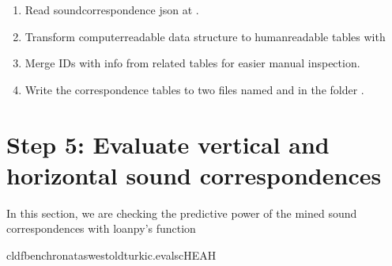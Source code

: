 \documentclass[letterpaper,10pt,english]{sphinxmanual}
\begin{document}
\begin{fulllineitems}
\label{\detokenize{mkloanpy:ronataswestoldturkiccommands.vizsc.run}}
\pysigstartsignatures
{}
\pysigstopsignatures\begin{enumerate}
%
\item {} 
\sphinxAtStartPar
Read sound\sphinxhyphen{}correspondence json at .

\item {} 
\sphinxAtStartPar
Transform computer\sphinxhyphen{}readable data structure to human\sphinxhyphen{}readable tables
with 

\item {} 
\sphinxAtStartPar
Merge IDs with info from related tables for easier manual inspection.

\item {} 
\sphinxAtStartPar
Write the correspondence tables to two files named
 and 
in the folder .

\end{enumerate}

\end{fulllineitems}



\section{Step 5: Evaluate vertical and horizontal sound correspondences}
\label{\detokenize{mkloanpy:step-5-evaluate-vertical-and-horizontal-sound-correspondences}}
\sphinxAtStartPar
In this section, we are checking the predictive power of the mined
sound correspondences with loanpy’s 
function

\begin{sphinxVerbatim}[commandchars=\\\{\}]
cldfbenchronataswestoldturkic.evalscHEAH
\end{sphinxVerbatim}
\end{document}
